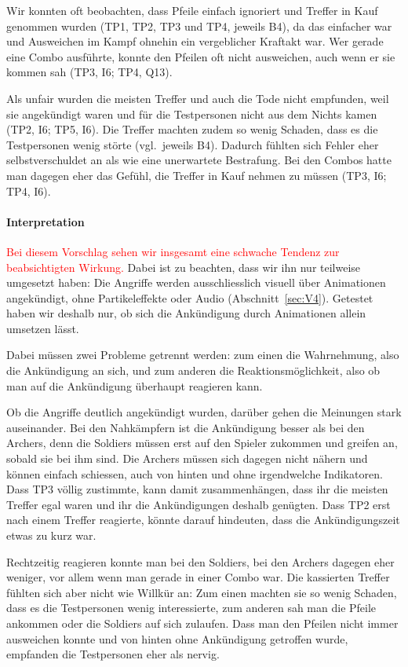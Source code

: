 \documentclass[../Main.tex]{subfiles}
\begin{document}
Wir konnten oft beobachten, dass Pfeile einfach ignoriert und Treffer in Kauf genommen wurden (TP1, TP2, TP3 und TP4, jeweils B4), da das einfacher war und Ausweichen im Kampf ohnehin ein vergeblicher Kraftakt war. Wer gerade eine Combo ausführte, konnte den Pfeilen oft nicht ausweichen, auch wenn er sie kommen sah (TP3, I6; TP4, Q13).

Als unfair wurden die meisten Treffer und auch die Tode nicht empfunden, weil sie angekündigt waren und für die Testpersonen nicht aus dem Nichts kamen (TP2, I6; TP5, I6). Die Treffer machten zudem so wenig Schaden, dass es die Testpersonen wenig störte (vgl.\ jeweils B4). Dadurch fühlten sich Fehler eher selbstverschuldet an als wie eine unerwartete Bestrafung. Bei den Combos hatte man dagegen eher das Gefühl, die Treffer in Kauf nehmen zu müssen (TP3, I6; TP4, I6).

\paragraph{Interpretation}
\textcolor{red}{Bei diesem Vorschlag sehen wir insgesamt eine schwache Tendenz zur beabsichtigten Wirkung.} Dabei ist zu beachten, dass wir ihn nur teilweise umgesetzt haben: Die Angriffe werden ausschliesslich visuell über Animationen angekündigt, ohne Partikeleffekte oder Audio (Abschnitt~\ref{sec:V4}). Getestet haben wir deshalb nur, ob sich die Ankündigung durch Animationen allein umsetzen lässt.

Dabei müssen zwei Probleme getrennt werden: zum einen die Wahrnehmung, also die Ankündigung an sich, und zum anderen die Reaktionsmöglichkeit, also ob man auf die Ankündigung überhaupt reagieren kann.

Ob die Angriffe deutlich angekündigt wurden, darüber gehen die Meinungen stark auseinander. Bei den Nahkämpfern ist die Ankündigung besser als bei den Archers, denn die Soldiers müssen erst auf den Spieler zukommen und greifen an, sobald sie bei ihm sind. Die Archers müssen sich dagegen nicht nähern und können einfach schiessen, auch von hinten und ohne irgendwelche Indikatoren. Dass TP3 völlig zustimmte, kann damit zusammenhängen, dass ihr die meisten Treffer egal waren und ihr die Ankündigungen deshalb genügten. Dass TP2 erst nach einem Treffer reagierte, könnte darauf hindeuten, dass die Ankündigungszeit etwas zu kurz war.

Rechtzeitig reagieren konnte man bei den Soldiers, bei den Archers dagegen eher weniger, vor allem wenn man gerade in einer Combo war. Die kassierten Treffer fühlten sich aber nicht wie Willkür an: Zum einen machten sie so wenig Schaden, dass es die Testpersonen wenig interessierte, zum anderen sah man die Pfeile ankommen oder die Soldiers auf sich zulaufen. Dass man den Pfeilen nicht immer ausweichen konnte und von hinten ohne Ankündigung getroffen wurde, empfanden die Testpersonen eher als nervig.
\end{document}
